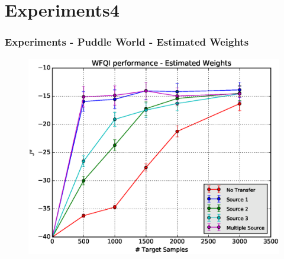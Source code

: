 \documentclass[professionalfont]{beamer}
\begin{document}
    \section{Experiments4}
      \begin{frame}
      \frametitle{Experiments - Puddle World - Estimated Weights}
        \begin{figure}
          \includegraphics[scale=0.5]{images/WFQIPerf.eps}
          \label{}
        \end{figure}
      \end{frame}
\end{document}
